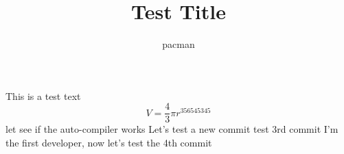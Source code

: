 \documentclass[a4paper]{report}
\title{Test Title}
\author{pacman}
\begin{document}
  This is a test text
  $$V=\frac{4}{3}\pi r^356545345$$
  let see if the auto-compiler works
  Let's test a new commit
  test 3rd commit
  I'm the first developer, now let's test the 4th commit
\end{document}
